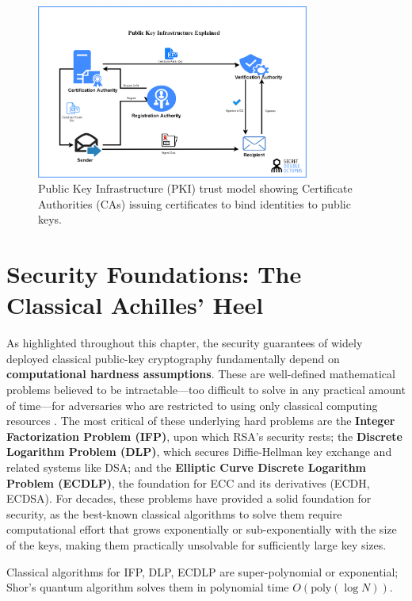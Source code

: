 \begin{figure}[ht]
    \centering
    \includegraphics[width=0.8\textwidth]{03_Classical_Cryptography/pki_trust_model}
    \caption{Public Key Infrastructure (PKI) trust model showing Certificate Authorities (CAs) issuing certificates to bind identities to public keys.}
    \label{fig:pki_model_ch3}
\end{figure}

\section{Security Foundations: The Classical Achilles' Heel}\label{sec:security_foundations_ch3}

As highlighted throughout this chapter, the security guarantees of widely deployed classical public-key cryptography fundamentally depend on \textbf{computational hardness assumptions}. These are well-defined mathematical problems believed to be intractable—too difficult to solve in any practical amount of time—for adversaries who are restricted to using only classical computing resources \parencite{katz2014introduction}. The most critical of these underlying hard problems are the \textbf{Integer Factorization Problem (IFP)}, upon which RSA's security rests; the \textbf{Discrete Logarithm Problem (DLP)}, which secures Diffie-Hellman key exchange and related systems like DSA; and the \textbf{Elliptic Curve Discrete Logarithm Problem (ECDLP)}, the foundation for ECC and its derivatives (ECDH, ECDSA). For decades, these problems have provided a solid foundation for security, as the best-known classical algorithms to solve them require computational effort that grows exponentially or sub-exponentially with the size of the keys, making them practically unsolvable for sufficiently large key sizes.

Classical algorithms for IFP, DLP, ECDLP are super-polynomial or exponential; Shor's quantum algorithm solves them in polynomial time $O(\text{poly}(\log N))$.

